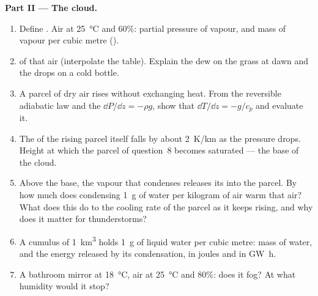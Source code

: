 \begin{problem}
\medskip
\noindent\textbf{Part II --- The cloud.}
\begin{enumerate}[resume]
  \item Define . Air at \qty{25}{\degreeCelsius} and $60\%$:
        partial pressure of vapour, and mass of vapour per cubic metre
        ().
  \item {} of that air (interpolate the table). Explain the dew
        on the grass at dawn and the drops on a cold bottle.
  \item A parcel of dry air rises without exchanging heat. From the
        reversible adiabatic law and the 
        $\dd P/\dd z = -\rho g$, show that $\dd T/\dd z = -g/c_p$ and
        evaluate it.
  \item The  of the rising parcel itself falls by about
        \qty{2}{K/km} as the pressure drops. Height at which the parcel of
        question~8 becomes saturated --- the base of the cloud.
  \item Above the base, the vapour that condenses releases its  into the parcel. By how much does condensing \qty{1}{g} of
        water per kilogram of air warm that air? What does this do to the
        cooling rate of the parcel as it keeps rising, and why does it
        matter for thunderstorms?
  \item A cumulus of \qty{1}{km^3} holds \qty{1}{g} of liquid water per cubic
        metre: mass of water, and the energy released by its
        condensation, in joules and in \unit{GW h}.
  \item A bathroom mirror at \qty{18}{\degreeCelsius}, air at
        \qty{25}{\degreeCelsius} and $80\%$: does it fog? At what humidity
        would it stop?
\end{enumerate}


\end{problem}
